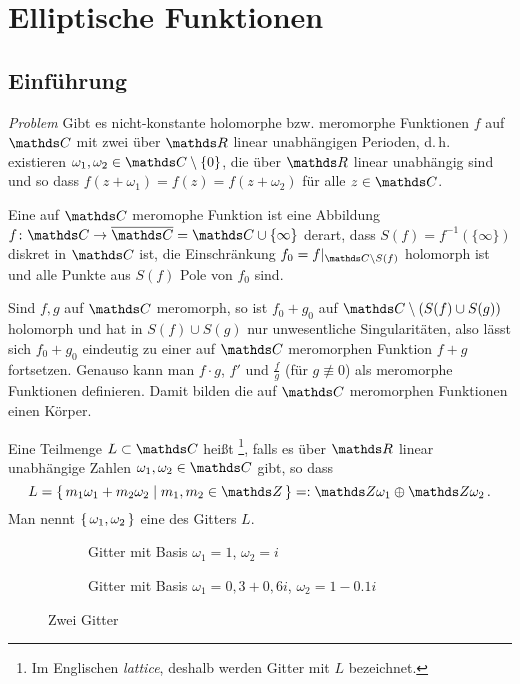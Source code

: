 \section{Elliptische Funktionen}

\subsection{Einführung}

\emph{Problem} Gibt es nicht-konstante holomorphe bzw. meromorphe Funktionen $f$ auf $\CC$ mit zwei über $\RR$ linear unabhängigen Perioden, d.\,h. existieren $\omega_1, \omega_2 \in \CC\setminus\{0\}$, die über $\RR$ linear unabhängig sind und so dass $f(z+\omega_1) = f(z) = f(z+\omega_2)$ für alle $z\in\CC$.

\begin{erin}
Eine auf $\CC$ meromophe Funktion ist eine Abbildung $f\colon \CC \ra \closure \CC = \CC \cup \{\infty\}$ derart, dass $S(f) = f^{-1}(\{\infty\})$ diskret in $\CC$ ist, die Einschränkung $f_0 = f|_{\CC\setminus S(f)}$ holomorph ist und alle Punkte aus $S(f)$ Pole von $f_0$ sind.

Sind $f, g$ auf $\CC$ meromorph, so ist $f_0 + g_0$ auf $\CC\setminus(S(f) \cup S(g))$ holomorph und hat in $S(f) \cup S(g)$ nur unwesentliche Singularitäten, also lässt sich $f_0 + g_0$ eindeutig zu einer auf $\CC$ meromorphen Funktion $f+g$ fortsetzen.
Genauso kann man $f\cdot g$, $f'$ und $\frac{f}{g}$ (für $g\not\equiv 0$) als meromorphe Funktionen definieren. Damit bilden die auf $\CC$ meromorphen Funktionen einen Körper.
\end{erin}

\begin{defi}
Eine Teilmenge $L \subset \CC$ heißt \footnote{Im Englischen \emph{lattice}, deshalb werden Gitter mit $L$ bezeichnet.}, falls es über $\RR$ linear unabhängige Zahlen $\omega_1, \omega_2\in\CC$ gibt, so dass
\[
	L = \Set{ m_1\omega_1 + m_2 \omega_2 \mid m_1, m_2 \in \ZZ}
	=: \ZZ\omega_1 \oplus \ZZ\omega_2
	\,.
\]
Man nennt $\left\{\,\omega_1, \omega_2\,\right\}$ eine  des Gitters $L$.
\end{defi}

\begin{figure}[h!]
\begin{center}
	\begin{subfigure}[t]{0.45\textwidth}
		
		\caption{Gitter mit Basis $\omega_1 = 1$, $\omega_2 = i$}
	\end{subfigure}%
	\begin{subfigure}[t]{0.45\textwidth}
		
		\caption{Gitter mit Basis $\omega_1 = 0,3+0,6i$, $\omega_2 = 1 - 0.1i$}
	\end{subfigure}%
	\caption{Zwei Gitter}
\end{center}
\end{figure}

